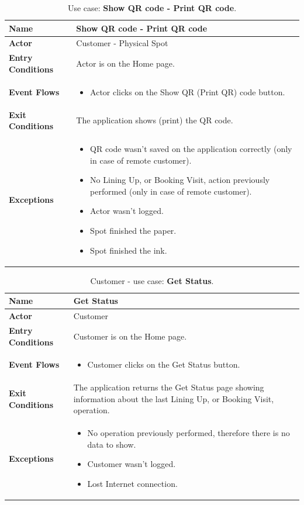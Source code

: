 \begin{table}[H]
\centering
\begin{tabular}{| m{} | m{} |} 
	\hline
	\textbf{Name} & Show QR code - Print QR code \\ 
	\hline
	\textbf{Actor} & Customer - Physical Spot \\ 
	\hline
	\textbf{Entry Conditions} & Actor is on the Home page. \\ 
	\hline
	\textbf{Event Flows} &
	\begin{itemize}
	\item Actor clicks on the Show QR (Print QR) code button.
	\end{itemize} \\ 
	\hline
	\textbf{Exit Conditions} & The application shows (print) the QR code. \\ 
	\hline
	\textbf{Exceptions} &
	\begin{itemize}
	\item QR code wasn't saved on the application correctly (only in case of remote customer).
	\item No Lining Up, or Booking Visit, action previously performed (only in case of remote customer).
	\item Actor wasn't logged.
	\item Spot finished the paper.
	\item Spot finished the ink.
	\end{itemize} \\ 
	\hline
\end{tabular}
\caption{Use case: \textbf{Show QR code - Print QR code}.}
\label{tableShowQR}
\end{table}

\begin{table}[H]
\centering
\begin{tabular}{| m{} | m{} |} 
	\hline
	\textbf{Name} & Get Status \\ 
	\hline
	\textbf{Actor} & Customer \\ 
	\hline
	\textbf{Entry Conditions} & Customer is on the Home page. \\ 
	\hline
	\textbf{Event Flows} &
	\begin{itemize}
	\item Customer clicks on the Get Status button.
	\end{itemize} \\ 
	\hline
	\textbf{Exit Conditions} & The application returns the Get Status page showing information about the last Lining Up, or Booking Visit, operation. \\ 
	\hline
	\textbf{Exceptions} &
	\begin{itemize}
	\item No operation previously performed, therefore there is no data to show.
	\item Customer wasn't logged.
	\item Lost Internet connection.
	\end{itemize} \\ 
	\hline
\end{tabular}
\caption{Customer - use case: \textbf{Get Status}.}
\label{tableGetStatus}
\end{table}

